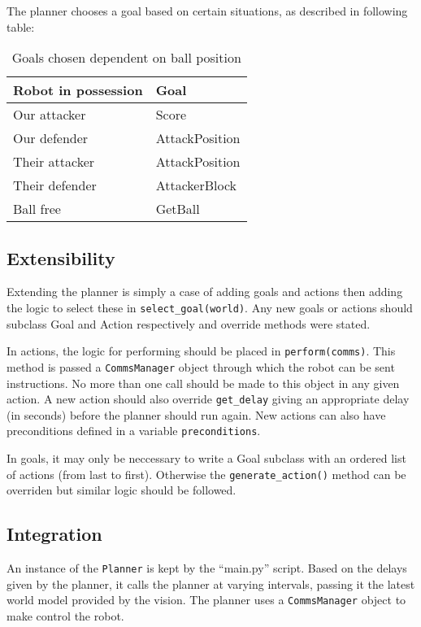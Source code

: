 The planner chooses a goal based on certain situations, as described in following table:



\begin{table}[H]
\centering
\caption{Goals chosen dependent on ball position}
\begin{tabular}{ | l | l | }
\hline
Robot in possession & Goal \\ \hline
Our attacker & Score \\
Our defender & AttackPosition \\
Their attacker & AttackPosition \\
Their defender & AttackerBlock \\
Ball free & GetBall \\
\hline
\end{tabular}
\end{table}


\subsection{Extensibility}

Extending the planner is simply a case of adding goals and actions then adding the logic to select these in \texttt{select\_goal(world)}. Any new goals or actions should subclass Goal and Action respectively and override methods were stated.

In actions, the logic for performing should be placed in \texttt{perform(comms)}. This method is passed a \texttt{CommsManager} object through which the robot can be sent instructions. No more than one call should be made to this object in any given action. A new action should also override \texttt{get\_delay} giving an appropriate delay (in seconds) before the planner should run again. New actions can also have preconditions defined in a variable \texttt{preconditions}.

In goals, it may only be neccessary to write a Goal subclass with an ordered list of actions (from last to first). Otherwise the \texttt{generate\_action()} method can be overriden but similar logic should be followed.

\subsection{Integration}

An instance of the \texttt{Planner} is kept by the ``main.py'' script. Based on the delays given by the planner, it calls the planner at varying intervals, passing it the latest world model provided by the vision. The planner uses a \texttt{CommsManager} object to make control the robot.

